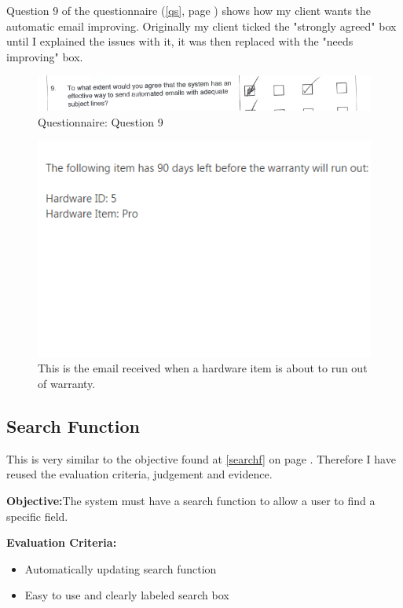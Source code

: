 Question 9 of the questionnaire (\ref{qs}, page \pageref{qs}) shows how my client wants the automatic email improving. Originally my client ticked the "strongly agreed" box until I explained the issues with it, it was then replaced with the "needs improving" box.

\begin{figure}[H]
    \includegraphics[width=\textwidth]{./Evaluation/EvaluationQuestionnaire/9.png}
    \caption{Questionnaire: Question 9} 
\end{figure}

\begin{figure}[H]
    \includegraphics[width=\textwidth]{./Testing/Images/EmailExpiredHardware.png}
    \caption{This is the email received when a hardware item is about to run out of warranty.} 
\end{figure}

\subsection{Search Function}

This is very similar to the objective found at \ref{searchf} on page \pageref{searchf}. Therefore I have reused the evaluation criteria, judgement and evidence.

\textbf{Objective:}The system must have a search function to allow a user to find a specific field.

\textbf{Evaluation Criteria:}
\begin{itemize}
\item{Automatically updating search function}
\item{Easy to use and clearly labeled search box}
\end{itemize}

